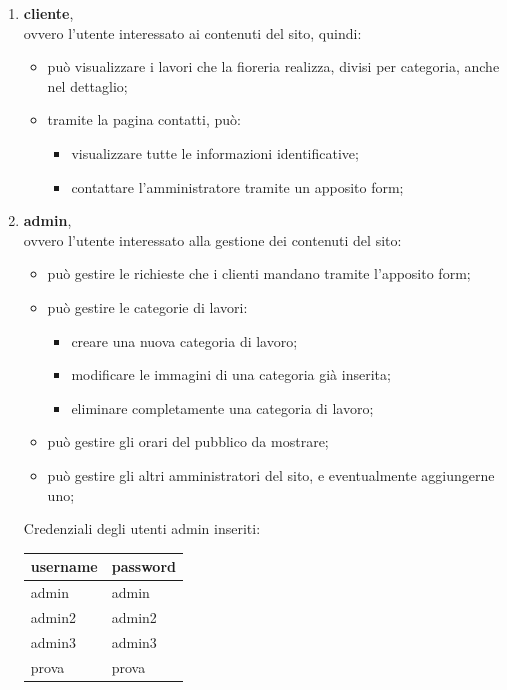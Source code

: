 \begin{enumerate}
\item \textbf{cliente}, \\ovvero l'utente interessato ai contenuti del sito, quindi:
\begin{itemize}
\item può visualizzare i lavori che la fioreria realizza, divisi per categoria, anche nel dettaglio;
\item tramite la pagina contatti, può: 
\begin{itemize}
\item visualizzare tutte le informazioni identificative;
\item contattare l'amministratore tramite un apposito form;
\end{itemize}  
\end{itemize}  
\item \textbf{admin}, \\ovvero l'utente interessato alla gestione dei contenuti del sito:
\begin{itemize}
\item può gestire le richieste che i clienti mandano tramite l'apposito form; 
\item può gestire le categorie di lavori:
\begin{itemize}
\item creare una nuova categoria di lavoro;
\item modificare le immagini di una categoria già inserita;
\item eliminare completamente una categoria di lavoro;
\end{itemize} 
\item può gestire gli orari del pubblico da mostrare;
\item può gestire gli altri amministratori del sito, e eventualmente aggiungerne uno;
\end{itemize}
Credenziali degli utenti admin inseriti:
\begin{center}
\begin{tabular}{|p{}|p{}|}
\hline
username          & password        \\
\hline
admin           & admin     \\
admin2         & admin2     \\
admin3         & admin3     \\
prova         & prova     \\
\hline
\end{tabular}
\end{center}
\end{enumerate}

